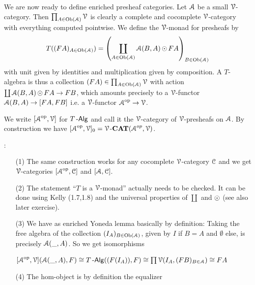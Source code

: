 \documentclass[a4paper,11pt,oneside,openany]{scrbook}
\begin{document}
We are now ready to define enriched presheaf categories. Let $\A$ be a small $\V$-category. Then $\prod_{A \in \Ob(\A)}\V$ is clearly a complete and
cocomplete $\V$-category with everything computed pointwise. We define the $\V$-monad for presheafs by
\begin{align*}
	T((FA)_{A \in \Ob(\A)}) = \left(\coprod_{A \in \Ob(\A)}\A(B,A)\copw FA\right)_{B \in \Ob(\A)}
\end{align*}
with unit given by identities and multiplication given by composition. A $T$-algebra is thus a collection $(FA) \in \prod_{A \in \Ob(\A)}\V$ with action
$\coprod \A(B,A) \copw FA \to FB$, which amounts precisely to a $\V$-functor $\A(B,A) \to [FA,FB]$ i.e. a $\V$-functor $\A^{\op} \to \V$.

\begin{defn}
	We write $[\A^{\op},\V]$ for $T\Alg$ and call it the $\V$-category of $\V$-presheafs on $\A$. By construction we have
	$[\A^{\op},\V]_{0} = \V$-$\CAT(\A^{op},\V)$.
\end{defn}

\begin{rmk}:
	\begin{itemize}
		\item[(1)]
		      The same construction works for any cocomplete $\V$-category $\C$ and we get $\V$-categories $[\A^{\op},\C]$ and $[\A,\C]$.
		\item[(2)]
		      The statement ``$T$ is a $\V$-monad'' actually needs to be checked. It can be done using Kelly (1.7,1.8)   %
		      and the universal properties of $\coprod$ and $\copw$ (see also later exercise).
		\item[(3)]
		      We have as enriched Yoneda lemma basically by definition: Taking the free algebra of the collection $(I_{A})_{B \in \Ob(\A)}$, given by
		      $I$ if $B=A$ and $\emptyset$ else, is precisely $\A(\_,A)$. So we get isomorphisms
		      \begin{center}
			      $\lbrack \A^{\op},\V \rbrack (\A(\_,A),F) \iso T\Alg((F(I_{A})),F) \iso \prod \V(I_{A},(FB)_{B\in \A}) \iso FA$
		      \end{center}
		\item[(4)]
		      The hom-object is by definition the equalizer
		      \begin{center}
		      \end{center}
	\end{itemize}
\end{rmk}
\end{document}
